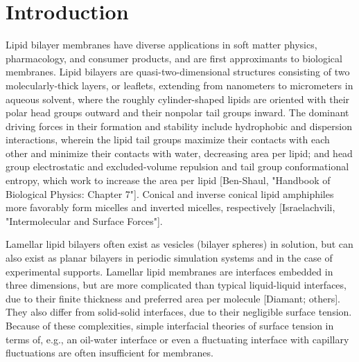 \documentclass[9pt,bestpractices]{livecoms}
\begin{document}
\section{Introduction}
Lipid bilayer membranes have diverse applications in soft matter physics, pharmacology, and consumer products, and are first approximants to biological membranes.
Lipid bilayers are quasi-two-dimensional structures consisting of two molecularly-thick layers, or leaflets, extending from nanometers to micrometers in aqueous solvent, where the roughly cylinder-shaped lipids are oriented with their polar head groups outward and their nonpolar tail groups inward.
The dominant driving forces in their formation and stability include hydrophobic and dispersion interactions, wherein the lipid tail groups maximize their contacts with each other and minimize their contacts with water, decreasing area per lipid; and head group electrostatic and excluded-volume repulsion and tail group conformational entropy, which work to increase the area per lipid [Ben-Shaul, "Handbook of Biological Physics: Chapter 7"].
Conical and inverse conical lipid amphiphiles more favorably form micelles and inverted micelles, respectively [Israelachvili, "Intermolecular and Surface Forces"].

Lamellar lipid bilayers often exist as vesicles (bilayer spheres) in solution, but can also exist as planar bilayers in periodic simulation systems and in the case of experimental supports.
Lamellar lipid membranes are interfaces embedded in three dimensions, but are more complicated than typical liquid-liquid interfaces, due to their finite thickness and preferred area per molecule [Diamant; others].
They also differ from solid-solid interfaces, due to their negligible surface tension.
Because of these complexities, simple interfacial theories of surface tension in terms of, e.g., an oil-water interface or even a fluctuating interface with capillary fluctuations are often insufficient for membranes.
\end{document}
